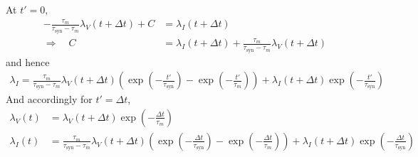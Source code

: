 \documentclass[a4paper]{article}
\begin{document}
At $t' = 0$,
\begin{align}
  - \frac{\tau_m}{\tau_{\text{syn}}-\tau_m} \lambda_V(t+\Delta t) + C
  &= \lambda_I(t+\Delta t) \\
  \Rightarrow \quad  C &= \lambda_I(t+\Delta t)  +
  \frac{\tau_m}{\tau_{\text{syn}}-\tau_m} \lambda_V(t+\Delta t)
\end{align}
and hence
\begin{align}
  \lambda_I = \frac{\tau_m}{\tau_{\text{syn}}-\tau_m}
  \lambda_V(t+\Delta t)  \left(\exp\left(-\frac{t'}{\tau_{\text{syn}}}\right) - \exp\left(-\frac{t'}{\tau_m}\right)\right) + \lambda_I(t+\Delta t) \exp\left(-\frac{t'}{\tau_{\text{syn}}}\right)
\end{align}
And accordingly for $t' = \Delta t$,
\begin{align}
  \lambda_V (t) &= \lambda_V(t+\Delta t) \exp\left(-\frac{\Delta
    t}{\tau_m}\right) \\
  \lambda_I (t) &= \frac{\tau_m}{\tau_{\text{syn}}-\tau_m}
  \lambda_V(t+\Delta t)  \left(\exp\left(-\frac{\Delta
    t}{\tau_{\text{syn}}}\right) - \exp\left(-\frac{\Delta
    t}{\tau_m}\right)\right) + \lambda_I(t+\Delta t)
  \exp\left(-\frac{\Delta t}{\tau_{\text{syn}}}\right)
\end{align}

  
\end{document}
